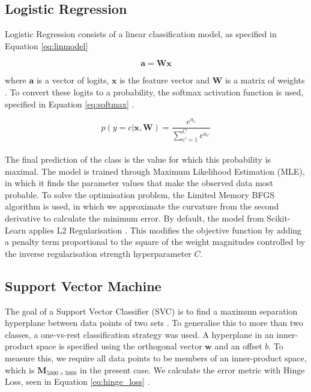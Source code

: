\documentclass[12pt,a4paper,english]{article}
\begin{document}
\subsection{Logistic Regression}
Logistic Regression consists of a linear classification model, as specified in Equation \eqref{eq:linmodel}

\begin{equation}
    \boldsymbol{a} = \boldsymbol{W}\boldsymbol{x}
    \label{eq:linmodel}
\end{equation}

where $\boldsymbol{a}$ is a vector of logits, $\boldsymbol{x}$ is the feature vector and $\boldsymbol{W}$ is a matrix of weights \cite{pml1Book}. To convert these logits to a probability, the softmax activation function is used, specified in Equation \eqref{eq:softmax} \cite{pml1Book}.

\begin{equation}
    p(y=c|\boldsymbol{x}, \boldsymbol{W}) = \frac{e^{a_c}}{\sum_{c'=1}^C e^{a_{c'}} }
    \label{eq:softmax}
\end{equation}
\\
The final prediction of the class is the value for which this probability is maximal. The model is trained through Maximum Likelihood Estimation (MLE), in which it finds the parameter values that make the observed data most probable. To solve the optimisation problem, the Limited Memory BFGS algorithm is used, in which we approximate the curvature from the second derivative to calculate the minimum error. By default, the model from Scikit-Learn applies L2 Regularisation \cite{scikit-learn}. This modifies the objective function by adding a penalty term proportional to the square of the weight magnitudes controlled by the inverse regularisation strength hyperparameter $C$. 

\subsection{Support Vector Machine}
The goal of a Support Vector Classifier (SVC) is to find a maximum separation hyperplane between data points of two sets \cite{lwkBook}. To generalise this to more than two classes, a one-vs-rest classification strategy was used. A hyperplane in an inner-product space is specified using the orthogonal vector $\boldsymbol{w}$ and an offset $b$. To measure this, we require all data points to be members of an inner-product space, which is $\boldsymbol{M}_{5000\times5000}$ in the present case. We calculate the error metric with Hinge Loss, seen in Equation \eqref{eq:hinge_loss} \cite{lwkBook}.
\end{document}
